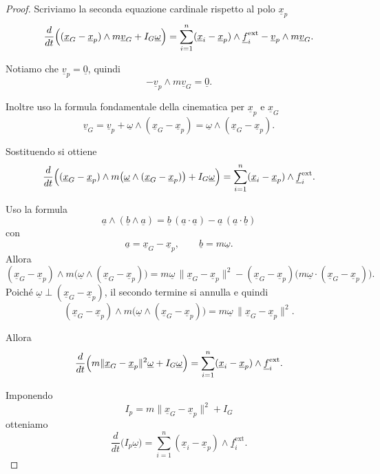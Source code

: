 \begin{proof}
Scriviamo la seconda equazione cardinale rispetto al polo \(\underline{x}_p\)
\[
\frac{d}{dt}\Bigl((\underline{x}_G-\underline{x}_p)\wedge m\underline{v}_G+I_G\underline{\omega}\Bigr)
=
\sum_{i=1}^{n} (\underline{x}_i-\underline{x}_p)\wedge \underline{f}_i^{\mathrm{ext}}
-
\underline{v}_p\wedge m\underline{v}_G.
\]

Notiamo che \(\underline{v}_p=\underline{0}\), quindi
\[
-\underline{v}_p\wedge m\underline{v}_G=\underline{0}.
\]

Inoltre uso la formula fondamentale della cinematica per \(\underline{x}_p\) e
\(\underline{x}_G\)
\[
\underline{v}_G=\underline{v}_p+\underline{\omega}\wedge(\underline{x}_G-\underline{x}_p)
=
\underline{\omega}\wedge(\underline{x}_G-\underline{x}_p).
\]

Sostituendo si ottiene
\[
\frac{d}{dt}\Bigl((\underline{x}_G-\underline{x}_p)\wedge
m\bigl(\underline{\omega}\wedge(\underline{x}_G-\underline{x}_p)\bigr)
+
I_G\underline{\omega}\Bigr)
=
\sum_{i=1}^{n} (\underline{x}_i-\underline{x}_p)\wedge \underline{f}_i^{\mathrm{ext}}.
\]

Uso la formula
\[
\underline{a}\wedge(\underline{b}\wedge \underline{a})
=
\underline{b}\,(\underline{a}\cdot \underline{a})
-
\underline{a}\,(\underline{a}\cdot \underline{b})
\]
con
\[
\underline{a}=\underline{x}_G-\underline{x}_p,
\qquad
\underline{b}=m\underline{\omega}.
\]
Allora
\[
(\underline{x}_G-\underline{x}_p)\wedge
m\bigl(\underline{\omega}\wedge(\underline{x}_G-\underline{x}_p)\bigr)
=
m\underline{\omega}\,\|\underline{x}_G-\underline{x}_p\|^2
-
(\underline{x}_G-\underline{x}_p)\bigl(m\underline{\omega}\cdot(\underline{x}_G-\underline{x}_p)\bigr).
\]
Poiché \(\underline{\omega}\perp(\underline{x}_G-\underline{x}_p)\), il secondo
termine si annulla e quindi
\[
(\underline{x}_G-\underline{x}_p)\wedge
m\bigl(\underline{\omega}\wedge(\underline{x}_G-\underline{x}_p)\bigr)
=
m\underline{\omega}\,\|\underline{x}_G-\underline{x}_p\|^2.
\]

Allora
\[
\frac{d}{dt}\Bigl(m\|\underline{x}_G-\underline{x}_p\|^2\underline{\omega}
+
I_G\underline{\omega}\Bigr)
=
\sum_{i=1}^{n} (\underline{x}_i-\underline{x}_p)\wedge \underline{f}_i^{\mathrm{ext}}.
\]

Imponendo
\[
I_p=m\|\underline{x}_G-\underline{x}_p\|^2+I_G
\]
otteniamo
\[
\frac{d}{dt}\bigl(I_p\underline{\omega}\bigr)
=
\sum_{i=1}^{n} (\underline{x}_i-\underline{x}_p)\wedge \underline{f}_i^{\mathrm{ext}}.
\]
\end{proof}


